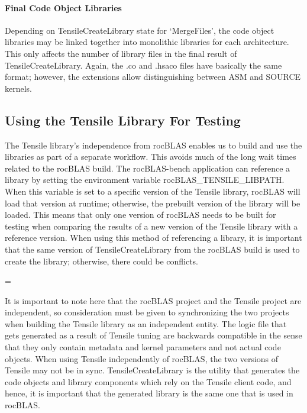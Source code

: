 \documentclass[]{article}
\newenvironment{warning}
{\par\begin{mdframed}[linewidth=2pt,linecolor=red]
		\begin{list}{}{\leftmargin=1cm
				\labelwidth=\leftmargin}\item[\Large\ding{43}]}
		{\end{list}\end{mdframed}\par}
\begin{document}
\paragraph{Final Code Object Libraries}

Depending on TensileCreateLibrary state for `MergeFiles', the code object libraries may be linked together into monolithic libraries for each architecture. This only affects the number of library files in the final result of TensileCreateLibrary. Again, the .co and .hsaco files have basically the same format; however, the extensions allow distinguishing between ASM and SOURCE kernels.

\subsection{Using the Tensile Library For Testing}
\label{sec:TensileCreateLib}

The Tensile library's independence from rocBLAS enables us to build and use the libraries as part of a separate workflow. This avoids much of the long wait times related to the rocBLAS build. The rocBLAS-bench application can reference a library by setting the environment variable rocBLAS\_TENSILE\_LIBPATH. When this variable is set to a specific version of the Tensile library, rocBLAS will load that version at runtime; otherwise, the prebuilt version of the library will be loaded. This means that only one version of rocBLAS needs to be built for testing when comparing the results of a new version of the Tensile library with a reference version. When using this method of referencing a library, it is important that the same version of TensileCreateLibrary from the rocBLAS build is used to create the library; otherwise, there could be conflicts.

\begin{warning}
	It is important to note here that the rocBLAS project and the Tensile project are independent, so consideration must be given to synchronizing the two projects when building the Tensile library as an independent entity. The logic file that gets generated as a result of Tensile tuning are backwards compatible in the sense that they only contain metadata and kernel parameters and not actual code objects. When using Tensile independently of rocBLAS, the two versions of Tensile may not be in sync. TensileCreateLibrary is the utility that generates the code objects and library components which rely on the Tensile client code, and hence, it is important that the generated library is the same one that is used in rocBLAS.
\end{warning}
\end{document}
